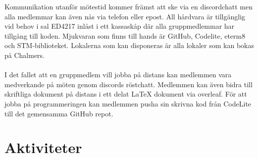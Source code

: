 \documentclass[a4paper]{article}
\begin{document}
Kommunikation utanför mötestid kommer främst att ske via en discordchatt men alla medlemmar kan även nås via telefon eller epost. All hårdvara är tillgänglig vid behov i sal ED4217 inlåst i ett kassaskåp där alla gruppmedlemmar har tillgång till koden. Mjukvaran som finns till hands är GitHub, Codelite, eterm8 och STM-biblioteket. Lokalerna som kan disponeras är alla lokaler som kan bokas på Chalmers.
\\\\
I det fallet att en gruppmedlem vill jobba på distans kan medlemmen vara medverkande på möten genom discords röstchatt. Medlemmen kan även bidra till skriftliga dokument på distans i ett delat LaTeX dokument via overleaf. För att jobba på programmeringen kan medlemmen pusha sin skrivna kod från CodeLite till det gemensamma GitHub repot.


\section{Aktiviteter} %
\end{document}
